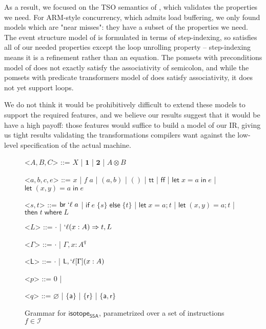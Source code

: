 \documentclass[acmsmall,screen,review]{acmart}
\newcommand{\mc}[1]{\ensuremath{\mathcal{#1}}}
\newcommand{\ms}[1]{\ensuremath{\mathsf{#1}}}
\newcommand{\lbl}[1]{{`#1}}
\newcommand{\lto}{\Rightarrow}
\newcommand{\ctt}{\ms{tt}}
\newcommand{\cff}{\ms{ff}}
\newcommand{\letexpr}[3]{\ensuremath{\ms{let}\;#1 = #2\;\ms{in}\;#3}}
\newcommand{\letstmt}[3]{\ensuremath{\ms{let}\;#1 = #2; #3}}
\newcommand{\brb}[2]{\ms{br}\;#1\;#2}
\newcommand{\lbrb}[2]{\brb{\lbl{#1}}{#2}}
\newcommand{\ite}[3]{\ms{if}\;#1\;\{#2\}\;\ms{else}\;\{#3\}}
\newcommand{\ewhere}[2]{\ms{then}\;#1\;\ms{where}\;#2}
\newcommand{\wbranch}[3]{#1(#2) \lto #3}
\newcommand{\lwbranch}[3]{\wbranch{\lbl{#1}}{#2}{#3}}
\newcommand{\thyp}[3]{#1: {#2}^{#3}}
\newcommand{\taff}{{\{\ms{a}\}}}
\newcommand{\trel}{{\{\ms{r}\}}}
\newcommand{\tint}{{\{\ms{a}, \ms{r}\}}}
\newcommand{\isotopessa}{\ms{isotope_{SSA}}}
\begin{document}
As a result, we focused on the TSO semantics of \citet{sparky}, which validates
the properties we need. For ARM-style concurrency, which admits load buffering,
we only found models which are "near misses": they have a subset of the
properties we need. The event structure model of
\citet{paviotti-modular-relaxed-dep-20} is formulated in terms of step-indexing,
so satisfies all of our needed properties except the loop unrolling property --
step-indexing means it is a refinement rather than an equation. The pomsets with
preconditions model of \citet{jagadeesan-pwp-20} does not exactly satisfy the
associativity of semicolon, and while the pomsets with predicate transformers
model of \citet{leaky-semicolon} does satisfy associativity, it does not yet
support loops.

We do not think it would be prohibitively difficult to extend these models to
support the required features, and we believe our results suggest that it would
be have a high payoff: those features would suffice to build a model of our IR,
giving us tight results validating the transformations compilers want against
the low-level specification of the actual machine. 




\clearpage 

\appendix

\begin{figure}
  \begin{center}
    \begin{grammar}
      <\(A, B, C\)> ::= 
      \(X\)
      \;|\; \(\mathbf{1}\)
      \;|\; \(\mathbf{2}\)
      \;|\; \(A \otimes B\)

      <\(a, b, c, e\)> ::= \(x\) 
      \;|\; \(f\;a\)
      \;|\; \((a, b)\) 
      \;|\; \(()\) 
      \;|\; \(\ctt\) 
      \;|\; \(\cff\)
      \;|\; \(\letexpr{x}{a}{e}\)
      \;|\; \(\letexpr{(x, y)}{a}{e}\)
      
      <\(s, t\)> ::= \(\lbrb{\ell}{a}\) 
      \;|\; \(\ite{e}{s}{t}\)
      \;|\; \(\letstmt{x}{a}{t}\)
      \;|\; \(\letstmt{(x, y)}{a}{t}\)
      \;|\; \(\ewhere{t}{L}\)

      <\(L\)> ::= \(\cdot\) \;|\; \(\lwbranch{\ell}{x: A}{t}, L\)

      <\(\Gamma\)> ::= \(\cdot\) \;|\; \(\Gamma, \thyp{x}{A}{q}\)

      <\(\ms{L}\)> ::= \(\cdot\) \;|\; \(\ms{L}, \lbl{\ell}[\Gamma](x: A)\)

      <\(p\)> ::= 0 \;|

      <\(q\)> ::= \(\varnothing\) 
      \;|\; \(\taff\) 
      \;|\; \(\trel\) 
      \;|\; \(\tint\)
    \end{grammar}
  \end{center}
  \caption{Grammar for \isotopessa, parametrized over a set of instructions \(f \in \mc{I}\)}
  \label{fig:ssa-grammar}
\end{figure}
\end{document}
